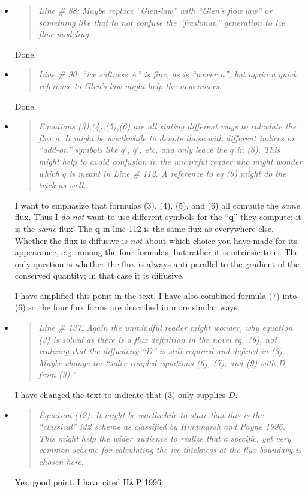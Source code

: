 \documentclass[11pt,reqno]{amsart}
\newcommand{\reply}[2]{
\medskip\medskip
\item  \begin{quote}
\emph{#1}
\end{quote}

\medskip
\noindent #2}
\begin{document}
\begin{itemize}
{However, I have reviewed the paper for the unnecessary use of personal pronouns and have removed several instances of ``we'', especially in the abstract where it may be most distracting.}

\reply{Line \# 88: Maybe replace ``Glen-law'' with ``Glen's flow law'' or something like that to not confuse the ``freshman'' generation to ice flow modeling.}
{Done.}

\reply{Line \# 90: ``ice softness A'' is fine, as is ``power n'', but again a quick reference to Glen's law might help the newcomers.}
{Done.}

\reply{Equations (3),(4),(5),(6) are all stating different ways to calculate the flux q. It might be worthwhile to denote those with different indices or ``add-on'' symbols like $q'$, $q'$, etc. and only leave the $q$ in (6). This might help to avoid confusion in the uncareful reader who might wonder which $q$ is meant in Line \# 112. A reference to eq (6) might do the trick as well.}
{I want to emphasize that formulas (3), (4), (5), and (6) all compute the \emph{same} flux.  Thus I \emph{do not} want to use different symbols for the ``$\mathbf{q}$'' they compute; it is the \emph{same} flux!  The $\mathbf{q}$ in line 112 is the same flux as everywhere else.  Whether the flux is diffusive is \emph{not} about which choice you have made for its appearance, e.g.~among the four formulas, but rather it is intrinsic to it.  The only question is whether the flux is always anti-parallel to the gradient of the conserved quantity; in that case it is diffusive.

I have amplified this point in the text.  I have also combined formula (7) into (6) so the four flux forms are described in more similar ways.}

\reply{Line \# 137. Again the unmindful reader might wonder, why equation (3) is solved as there is a flux definition in the novel eq.~(6), not realizing that the diffusivity ``D'' is still required and defined in (3). Maybe change to: ``solve coupled equations (6), (7), and (9) with D from (3).''}
{I have changed the text to indicate that (3) only supplies $D$.}

\reply{Equation (12): It might be worthwhile to state that this is the ``classical'' M2 scheme as classified by Hindmarsh and Payne 1996. This might help the wider audience to realize that a specific, yet very common scheme for calculating the ice thickness at the flux boundary is chosen here.}
{Yes, good point.  I have cited H\&P 1996.}


\end{itemize}
\end{document}
